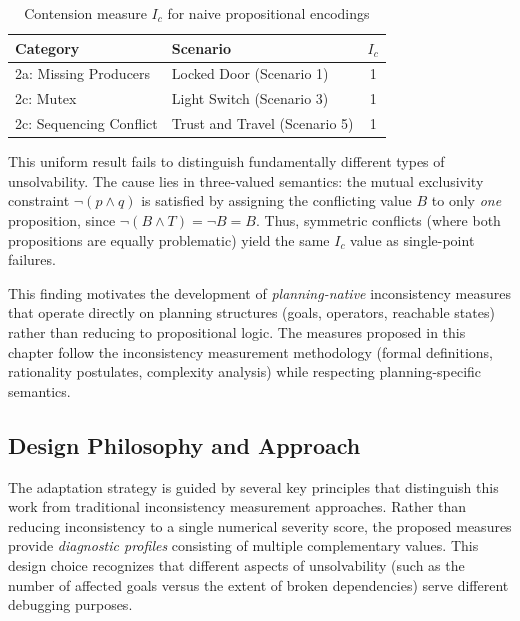 \begin{table}[ht]
    \centering
    \caption{Contension measure $I_c$ for naive propositional encodings}
    \label{tab:naive_ic}
    \begin{tabular}{llc}
        \hline
        Category                & Scenario                      & $I_c$ \\
        \hline
        2a: Missing Producers   & Locked Door (Scenario 1)      & 1     \\
        2c: Mutex               & Light Switch (Scenario 3)     & 1     \\
        2c: Sequencing Conflict & Trust and Travel (Scenario 5) & 1     \\
        \hline
    \end{tabular}
\end{table}

This uniform result fails to distinguish fundamentally different types of unsolvability. The cause lies in three-valued semantics: the mutual exclusivity constraint $\neg(p \land q)$ is satisfied by assigning the conflicting value $B$ to only \emph{one} proposition, since $\neg(B \land T) = \neg B = B$. Thus, symmetric conflicts (where both propositions are equally problematic) yield the same $I_c$ value as single-point failures.

This finding motivates the development of \emph{planning-native} inconsistency measures that operate directly on planning structures (goals, operators, reachable states) rather than reducing to propositional logic. The measures proposed in this chapter follow the inconsistency measurement methodology (formal definitions, rationality postulates, complexity analysis) while respecting planning-specific semantics.

\subsection{Design Philosophy and Approach}

The adaptation strategy is guided by several key principles that distinguish this work from traditional inconsistency measurement approaches. Rather than reducing inconsistency to a single numerical severity score, the proposed measures provide \emph{diagnostic profiles} consisting of multiple complementary values. This design choice recognizes that different aspects of unsolvability (such as the number of affected goals versus the extent of broken dependencies) serve different debugging purposes.

